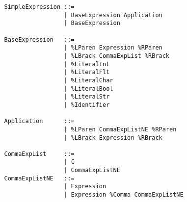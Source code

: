 \documentclass{article}
\begin{document}
\begin{verbatim}
				SimpleExpression ::=
				                 | BaseExpression Application
				                 | BaseExpression
				
				BaseExpression   ::=
				                 | %LParen Expression %RParen
				                 | %LBrack CommaExpList %RBrack
				                 | %LiteralInt
				                 | %LiteralFlt
				                 | %LiteralChar
				                 | %LiteralBool
				                 | %LiteralStr
				                 | %Identifier
				                 
				Application      ::=
				                 | %LParen CommaExpListNE %RParen
				                 | %LBrack Expression %RBrack
				
				CommaExpList     ::=
				                 | €
				                 | CommaExpListNE
				CommaExpListNE   ::=
				                 | Expression
				                 | Expression %Comma CommaExpListNE
			\end{verbatim}
	
\end{document}
